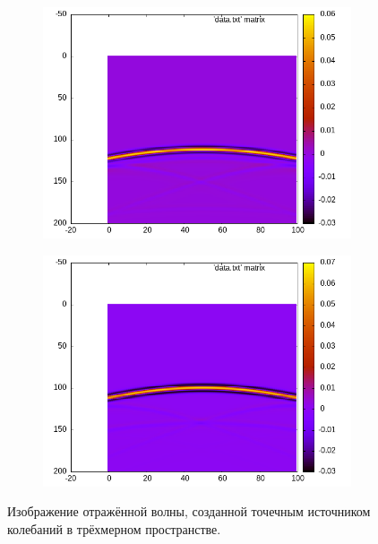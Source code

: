 \documentclass[a4paper, fontsize=14pt]{article}
\begin{document}
	\begin{figure}[h]
	\begin{subfigure}{.5\textwidth}
		\includegraphics[width=1\textwidth]{kflat0.png}
	\end{subfigure}
	\begin{subfigure}{.5\textwidth}
		\includegraphics[width=\textwidth]{kflat0.5.png}
	\end{subfigure}
	
	\caption{Изображение отражённой волны, созданной точечным источником колебаний в трёхмерном пространстве.   
	}
	\label{fig:kmodflatxt}
	\end{figure}
\end{document}
